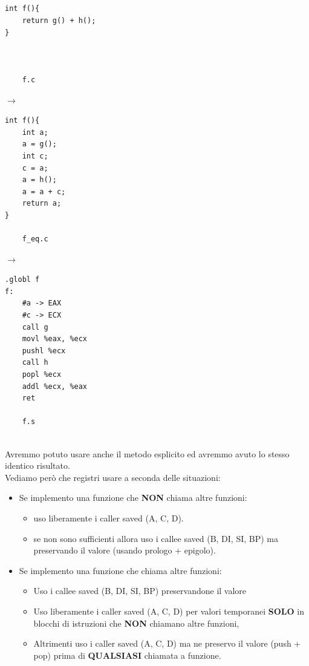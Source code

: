 \begin{minipage}{0.2\textwidth}
    \begin{verbatim}
    



int f(){
    return g() + h();
}



    f.c
    \end{verbatim}
\end{minipage}
\hfill
$\longrightarrow$
\hfill
\begin{minipage}{0.2\textwidth}
    \begin{verbatim}
int f(){
    int a; 
    a = g();
    int c;
    c = a;
    a = h();
    a = a + c;
    return a;
}

    f_eq.c
    \end{verbatim}
\end{minipage}
\hfill
$\longrightarrow$
\hfill
\begin{minipage}{0.2\textwidth}
    \begin{verbatim}
.globl f
f:
    #a -> EAX
    #c -> ECX
    call g 
    movl %eax, %ecx
    pushl %ecx
    call h
    popl %ecx
    addl %ecx, %eax
    ret
    
    f.s
    \end{verbatim}
\end{minipage}\medskip \\
Avremmo potuto usare anche il metodo esplicito ed avremmo avuto lo stesso identico risultato.\\
Vediamo però che registri usare a seconda delle situazioni:
\begin{itemize}
    \item Se implemento una funzione che \textbf{NON} chiama altre funzioni:
    \begin{itemize}
        \item uso liberamente i caller saved (A, C, D).
        \item  se non sono sufficienti allora uso i callee saved (B, DI, SI, BP) ma preservando il valore (usando prologo + epigolo).
    \end{itemize}
    \item Se implemento una funzione che chiama altre funzioni:
    \begin{itemize}
        \item Uso i callee saved (B, DI, SI, BP) preservandone il valore
        \item Uso liberamente i caller saved (A, C, D) per valori temporanei \textbf{SOLO} in blocchi di istruzioni che \textbf{NON} chiamano altre funzioni,
        \item Altrimenti uso i caller saved (A, C, D) ma ne preservo il valore (push + pop) prima di \textbf{QUALSIASI} chiamata a funzione.
    \end{itemize}
\end{itemize}
